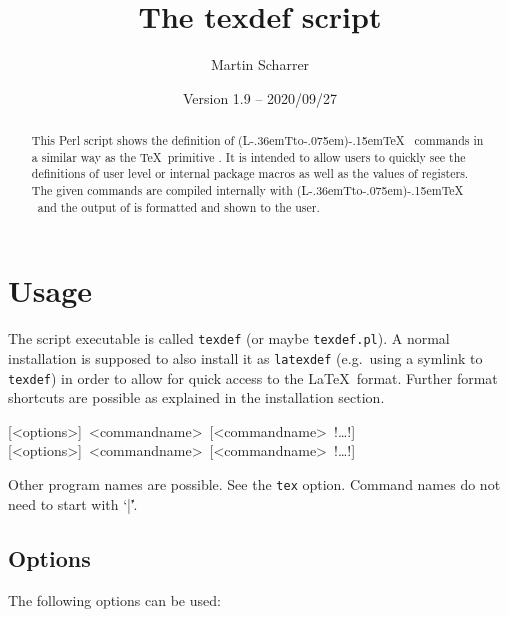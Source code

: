 \documentclass{ydoc}
\title{The \textsf{texdef} script}
\author{Martin Scharrer}
\date{Version 1.9 -- 2020/09/27}
\makeatletter
\DeclareRobustCommand{\LATeX}{%
    (L\kern -.36em{\sbox \z@ T\vbox to\ht \z@ {\hbox {\check@mathfonts \fontsize \sf@size \z@ \math@fontsfalse \selectfont A}\vss }}\kern -.075em)\kern -.15em\TeX
}
\makeatother
\begin{document}
\maketitle

\begin{abstract}
This Perl script shows the definition of \LATeX\ commands in a similar way as the \TeX\ primitive \Macro\show.
It is intended to allow users to quickly see the definitions of user level or internal package macros as well as the
values of registers. The given commands are compiled internally with \LATeX\ and the output of \Macro\show is formatted
and shown to the user.
\end{abstract}

\tableofcontents


\section{Usage}
The script executable is called \texttt{texdef} (or maybe \texttt{texdef.pl}).
A normal installation is supposed to also install it as \texttt{latexdef} (e.g.\ using a symlink to \texttt{texdef}) in order to 
allow for quick access to the \LaTeX\ format. Further format shortcuts are possible as explained in the installation section.

\parindent=0pt
[<options>]~<commandname>~[<commandname>~!\ldots!]
[<options>]~<commandname>~[<commandname>~!\ldots!]

Other program names are possible. See the \texttt{tex} option.  Command names do not need to start with `|\|'.

\subsection*{Options}
The following options can be used:
\par\medskip
\end{document}
